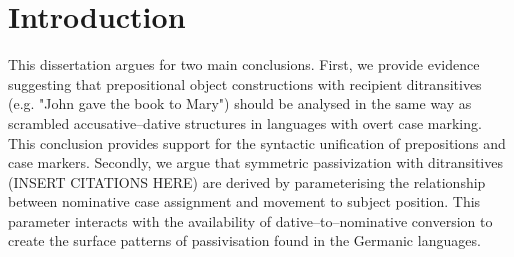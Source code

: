 %
%
%
%
%
%
%
%
%
%
%
%
%
%
%
%
%
%

\chapter{Introduction}
\label{ch:introduction}

This dissertation argues for two main conclusions. First, we provide evidence suggesting that prepositional object constructions with recipient ditransitives (e.g. "John gave the book to Mary") should be analysed in the same way as scrambled accusative--dative structures in languages with overt case marking. This conclusion provides support for the syntactic unification of prepositions and case markers. Secondly, we argue that symmetric passivization with ditransitives (INSERT CITATIONS HERE) are derived by parameterising the relationship between nominative case assignment and movement to subject position. This parameter interacts with the availability of dative--to--nominative conversion to create the surface patterns of passivisation found in the Germanic languages.

